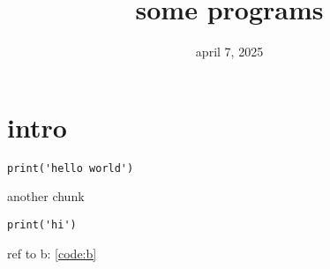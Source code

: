 \documentclass[a4paper]{report}
\begin{document}

\title{some programs}
\date{april 7, 2025}

\maketitle

{\sffamily
\tableofcontents
}

\chapter{intro}\label{ch:intro}


\setcounter{code}{0}


\begin{verbatim}
print('hello world')
\end{verbatim}

another chunk


\captionlistentry{}
\label{code:b}
\begin{verbatim}
print('hi')
\end{verbatim}

ref to b: \ref{code:b}
\end{document}
